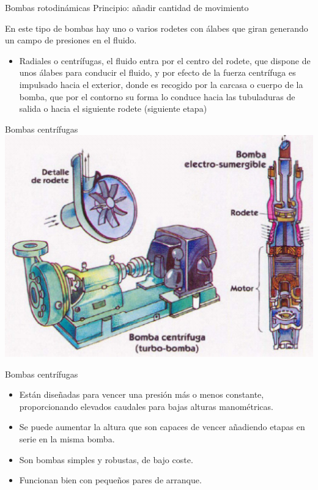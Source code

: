 \documentclass[xcolor={usenames,svgnames,dvipsnames}]{beamer}
\begin{document}
\begin{frame}[label=sec-2-2-6]{Bombas rotodinámicas}
Principio: añadir cantidad de movimiento

En este tipo de bombas hay uno o varios rodetes con álabes que giran
generando un campo de presiones en el fluido.

\begin{itemize}
\item \alert{Radiales o centrífugas}, el fluido entra por el centro del rodete,
que dispone de unos álabes para conducir el fluido, y por efecto de
la fuerza centrífuga es impulsado hacia el exterior, donde es
recogido por la carcasa o cuerpo de la bomba, que por el contorno su
forma lo conduce hacia las tubuladuras de salida o hacia el siguiente
rodete (siguiente etapa)
\end{itemize}
\end{frame}

\begin{frame}[label=sec-2-2-7]{Bombas centrífugas}
\includegraphics[width=.9\linewidth]{../figs/BombaCentrifuga.pdf}
\end{frame}

\begin{frame}[label=sec-2-2-8]{Bombas centrífugas}
\begin{itemize}
\item Están diseñadas para vencer una \alert{presión más o menos constante},
proporcionando \alert{elevados caudales para bajas alturas manométricas}.

\item Se puede aumentar la altura que son capaces de vencer añadiendo
etapas en serie en la misma bomba.

\item Son \alert{bombas simples y robustas, de bajo coste}.

\item Funcionan bien con pequeños pares de arranque.
\end{itemize}
\end{frame}
\end{document}
